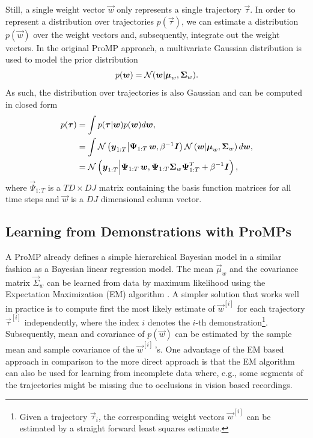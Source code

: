 Still, a single weight vector $\vec w$ only represents a single trajectory $\vec \tau$. In order to represent a distribution over 
trajectories $p(\vec \tau)$, we can estimate a distribution $p(\vec w)$ over the weight vectors and, subsequently, integrate out the weight vectors. 
In the original ProMP approach, a multivariate Gaussian distribution is used to model the prior distribution 
\begin{align}\label{eq:priorProMPs}
p(\boldsymbol{w}) = \mathcal{N}(\boldsymbol{w}| \boldsymbol{\mu}_w, \boldsymbol{\Sigma}_w). 
\end{align}
As such, the distribution over trajectories is also Gaussian and can be computed in closed form 
\begin{align*}
 p(\boldsymbol{\tau}) & =  \int p(\boldsymbol{\tau}| \boldsymbol{w}) p(\boldsymbol{w}) d\boldsymbol{w}, \\
 & =  \int \mathcal{N}\left(\boldsymbol{y}_{1:T}\middle| \boldsymbol{\Psi}_{1:T} \, \boldsymbol{w}, \beta^{-1}
    \boldsymbol{I}\right)  \mathcal{N}\left(\boldsymbol{w}\middle| \boldsymbol{\mu}_w, \boldsymbol{\Sigma}_w\right) d\boldsymbol{w},  \\
  & = \mathcal{N}\left(\boldsymbol{y}_{1:T}\middle| \boldsymbol{\Psi}_{1:T} \, \boldsymbol{w}, \boldsymbol{\Psi}_{1:T}
    \boldsymbol{\Sigma}_w \boldsymbol{\Psi}_{1:T}^T + \beta^{-1} \boldsymbol{I}\right),
\end{align*}
where $\vec \Psi_{1:T}$ is a $T D \times D J$ matrix containing the basis function matrices for all time steps 
and $\vec w$ is a $D J$ dimensional column vector.

\subsection{Learning from Demonstrations with ProMPs}

A ProMP already defines a simple hierarchical Bayesian model in a similar fashion as a Bayesian linear regression model. The mean $\vec \mu_w$ 
and the covariance matrix $\vec \Sigma_w$ can be learned from data by maximum likelihood using the Expectation Maximization (EM) algorithm \cite{Dempster1977}. 
A simpler solution that works well in practice is to compute first the most likely estimate of $\vec w^{[i]}$ for each trajectory $\vec \tau^{[i]}$ independently,
 where the index $i$ denotes the $i$-th demonstration\footnote{Given a trajectory $\vec \tau_i$, the corresponding 
weight vectors $\vec w^{[i]}$ can be estimated by a straight forward least squares estimate.}. 
Subsequently, mean and covariance of $p(\vec w)$ can be estimated 
by the sample mean and sample covariance of the $\vec w^{[i]}\,$'s. 
One advantage of the EM based approach in comparison to the more direct approach is that the 
EM algorithm can also be used for learning from incomplete data where, e.g., 
some segments of the trajectories might be missing due to occlusions in vision based recordings.

